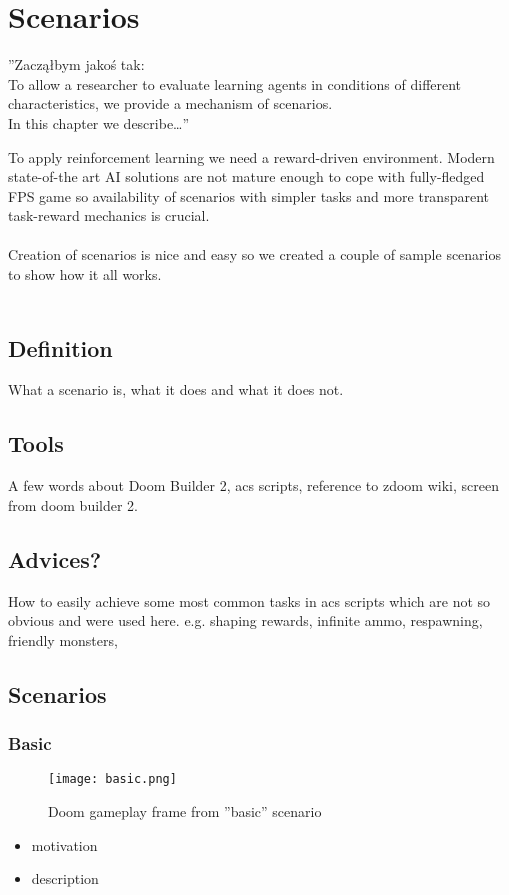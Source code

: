 
\chapter{Scenarios}


''Zacząłbym jakoś tak:
\\
To allow a researcher to evaluate learning agents in conditions of different characteristics, we provide a mechanism of scenarios.
\\
In this chapter we describe…''

To apply reinforcement learning we need a reward-driven environment. Modern state-of-the art AI solutions are not mature enough to cope with fully-fledged FPS game so availability of scenarios with simpler tasks and more transparent task-reward mechanics is crucial.\\
\\
Creation of scenarios is nice and easy so we created a couple of sample scenarios to show how it all works.\\
\\
\section{Definition}
What a scenario is, what it does and what it does not.

\section{Tools}
A few words about Doom Builder 2, acs scripts, reference to zdoom wiki, screen from doom builder 2.

\section{Advices?}
How to easily achieve some most common tasks in acs scripts which are not so obvious and were used here.
e.g. shaping rewards, infinite ammo, respawning, friendly monsters, 


\newpage
\section{Scenarios}
\subsection{Basic}
	\begin{figure}[h]
		\centering
		\texttt{[image: basic.png]}
		\caption{Doom gameplay frame from ''basic'' scenario}
	\end{figure}
\begin{itemize}
	\item motivation
	\item description
\end{itemize}

